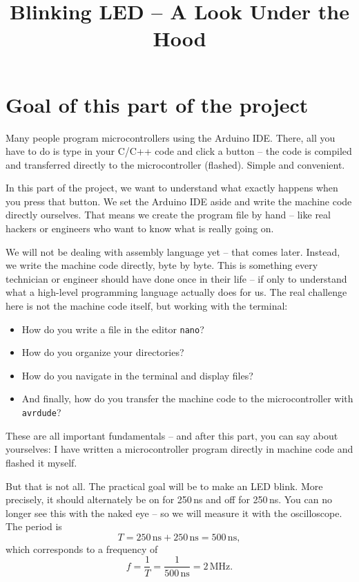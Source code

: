 \documentclass[a4paper,12pt]{article}
\title{Blinking LED – A Look Under the Hood}
\author{}
\date{}
\begin{document}
\maketitle

\section{Goal of this part of the project}

Many people program microcontrollers using the Arduino IDE. There, all you
have to do is type in your C/C++ code and click a button – the code is
compiled and transferred directly to the microcontroller (flashed). Simple
and convenient.

In this part of the project, we want to understand what exactly happens when
you press that button. We set the Arduino IDE aside and write the machine
code directly ourselves. That means we create the program file by hand –
like real hackers or engineers who want to know what is really going on.

We will not be dealing with assembly language yet – that comes later.
Instead, we write the machine code directly, byte by byte. This is something
every technician or engineer should have done once in their life – if only
to understand what a high-level programming language actually does for us.
The real challenge here is not the machine code itself, but working with
the terminal:
\begin{itemize}
    \item
	How do you write a file in the editor \texttt{nano}?
    \item
	How do you organize your directories?
    \item
	How do you navigate in the terminal and display files?
    \item
	And finally, how do you transfer the machine code to the
	microcontroller with \texttt{avrdude}?
\end{itemize}

\noindent
These are all important fundamentals – and after this part, you can say
about yourselves: I have written a microcontroller program directly in
machine code and flashed it myself.

But that is not all. The practical goal will be to make an LED blink. More
precisely, it should alternately be on for 250\,ns and off for 250\,ns. You
can no longer see this with the naked eye – so we will measure it with the
oscilloscope. The period is
\[
T = 250\,\text{ns} + 250\,\text{ns} = 500\,\text{ns},
\]
which corresponds to a frequency of
\[
f = \frac{1}{T} = \frac{1}{500\,\text{ns}} = 2\,\text{MHz}.
\]
\end{document}
